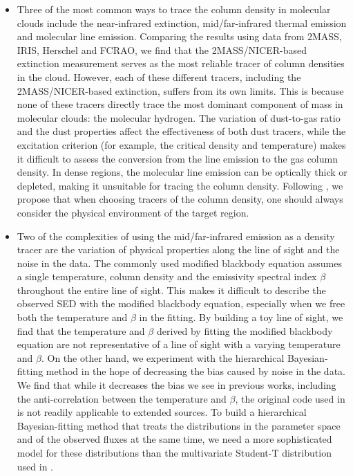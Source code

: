 \documentclass[11pt,a4paper]{emulateapj}
\begin{document}
\begin{itemize}
\item Three of the most common ways to trace the column density in molecular clouds include the near-infrared extinction, mid/far-infrared thermal emission and molecular line emission. Comparing the results using data from 2MASS, IRIS, Herschel and FCRAO, we find that the 2MASS/NICER-based extinction measurement serves as the most reliable tracer of column densities in the cloud. However, each of these different tracers, including the 2MASS/NICER-based extinction, suffers from its own limits. This is because none of these tracers directly trace the most dominant component of mass in molecular clouds: the molecular hydrogen. The variation of dust-to-gas ratio and the dust properties affect the effectiveness of both dust tracers, while the excitation criterion (for example, the critical density and temperature) makes it difficult to assess the conversion from the line emission to the gas column density. In dense regions, the molecular line emission can be optically thick or depleted, making it unsuitable for tracing the column density. Following \citet{Goodman_2009}, we propose that when choosing tracers of the column density, one should always consider the physical environment of the target region. 
\item Two of the complexities of using the mid/far-infrared emission as a density tracer are the variation of physical properties along the line of sight and the noise in the data. The commonly used modified blackbody equation assumes a single temperature, column density and the emissivity spectral index $\beta$ throughout the entire line of sight. This makes it difficult to describe the observed SED with the modified blackbody equation, especially when we free both the temperature and $\beta$ in the fitting. By building a toy line of sight, we find that the temperature and $\beta$ derived by fitting the modified blackbody equation are not representative of a line of sight with a varying temperature and $\beta$. On the other hand, we experiment with the hierarchical Bayesian-fitting method in the hope of decreasing the bias caused by noise in the data. We find that while it decreases the bias we see in previous works, including the anti-correlation between the temperature and $\beta$, the original code used in \citet{Kelly_2012} is not readily applicable to extended sources. To build a hierarchical Bayesian-fitting method that treats the distributions in the parameter space and of the observed fluxes at the same time, we need a more sophisticated model for these distributions than the multivariate Student-T distribution used in \citet{Kelly_2012}.

\end{itemize}
\end{document}
